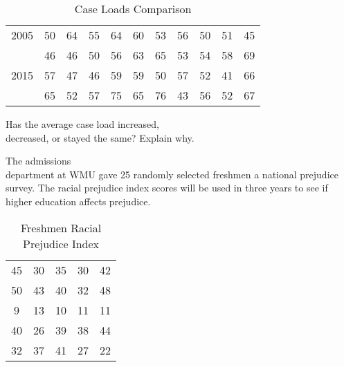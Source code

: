\documentclass[11pt]{book}\usepackage[]{graphicx}\usepackage[]{color}
\begin{document}
\begin{exercises}
\begin{exercise}
\begin{table}[htbp]
   \centering
   \caption{Case Loads Comparison}
   {\tiny{
   \begin{tabular}{@{} ccccccccccc  @{}} \hline %
   2005 & 50&64&55&64&60&53&56&50&51&45 \\ & 46&46&50&56&63&65&53&54&58&69 \\ \hline
   2015 & 57&47&46&59&59&50&57&52&41&66 \\ & 65&52&57&75&65&76&43&56&52&67 \\ \hline
   \end{tabular}

   \label{tab:t3_4a}
   }}
\end{table}

  Has the average case load increased, \\ decreased, or stayed the same? Explain why.

   \vspace{2mm}
  \end{exercise}
  \vspace{2mm}
% 
% 

  \begin{exercise} %
  


  The admissions \\ department at WMU gave 25 randomly selected freshmen a national prejudice survey.  The racial prejudice index scores  will be used in three years to see if higher education affects prejudice.

\begin{table}[htbp]
   \centering
   {\small{
   \caption{Freshmen Racial Prejudice Index}
   \begin{tabular}{@{} ccccc  @{}} \hline %
   45 & 30 & 35 & 30 & 42 \\
   50 & 43 & 40 & 32 & 48 \\
   9  & 13 & 10 & 11 & 11 \\
   40 & 26 & 39 & 38 & 44 \\
   32 & 37 & 41 & 27 & 22 \\ \hline
   \end{tabular}
   \label{tab:t3_12}
   }}
\end{table}


\end{exercise}
\end{exercises}
\end{document}
